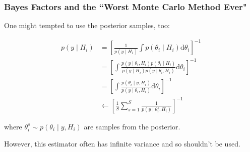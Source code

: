 \documentclass{beamer}
\begin{document}
\begin{frame}
\frametitle{Bayes Factors and the ``Worst Monte Carlo Method Ever" }

One might tempted to use the posterior samples, too:

\begin{align*}
p(y \mid H_i)
&= \left[ \frac{1}{p(y \mid H_i)} \int p(\theta_i \mid  H_i) \text{d}\theta_i \right]^{-1} \\
&= \left[  \int \frac{p(y \mid \theta_i,  H_i)p(\theta_i \mid H_i)}{p(y \mid H_i) p(y \mid \theta_i, H_i) } \text{d}\theta_i \right]^{-1}\\
&= \left[  \int \frac{p(\theta_i\mid y,  H_i) }{p(y \mid \theta_i, H_i) } \text{d}\theta_i \right]^{-1} \\
& \leftarrow  \left[  \frac{1}{S}\sum_{s=1}^S\frac{1 }{p(y \mid \theta_i^s, H_i) } \right]^{-1}
\end{align*}

where $\theta^s_i \sim p(\theta_i\mid y,  H_i)$ are samples from the posterior. 
\newline

However, this estimator often has infinite variance and so shouldn't be used. 
\end{frame}
\end{document}
